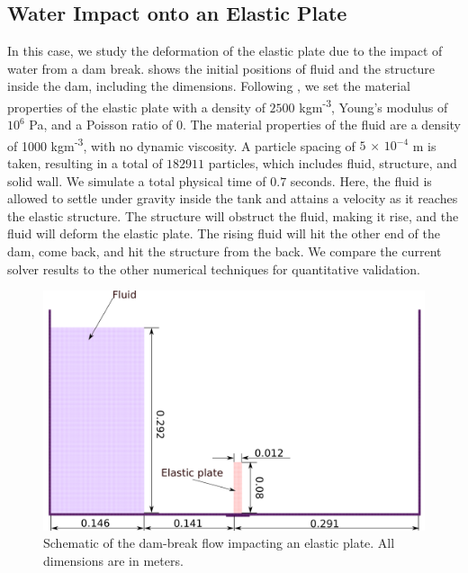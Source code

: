 \subsection{Water Impact onto an Elastic Plate}
\label{sec:water-impact-forefront}
In this case, we study the deformation of the elastic
plate due to the impact of water from a dam break.
 shows the initial positions
of fluid and the structure inside the dam, including the dimensions. Following
\cite{sun2019fully}, we set the material properties of the elastic plate with a
density of $2500$ kgm\textsuperscript{-3}, Young's modulus of $10^6$ Pa, and a
Poisson ratio of $0$. The material properties of the fluid are a density of 1000
kgm\textsuperscript{-3}, with no dynamic viscosity. A particle spacing of $5$
$\times$ $10^{-4}$ m is taken, resulting in a total of $182911$ particles, which
includes fluid, structure, and solid wall. We simulate a total physical time of
$0.7$ seconds. Here, the fluid is allowed to settle under gravity inside the
tank and attains a velocity as it reaches the elastic structure. The structure
will obstruct the fluid, making it rise, and the fluid will deform the elastic
plate. The rising fluid will hit the other end of the dam, come back, and hit
the structure from the back. We compare the current solver results to the other
numerical techniques for quantitative validation.
\begin{figure}
  \centering
  \includegraphics[scale=0.4]{images/fsi/images/sun_2019_dam_breaking_flow_impacting_an_elastic_plate/schematic}
  \caption{Schematic of the dam-break flow impacting an elastic plate. All dimensions are in meters.}
\label{fig:dam-break-flow-impact-plate-initial-setup}
\end{figure}


